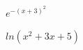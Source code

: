 \documentclass{ximera}
\begin{document}
\begin{example}   $e^{-(x+3)^2}$




\end{example}













\begin{example}   $ln(x^2 + 3x + 5)$




\end{example}
\end{document}
